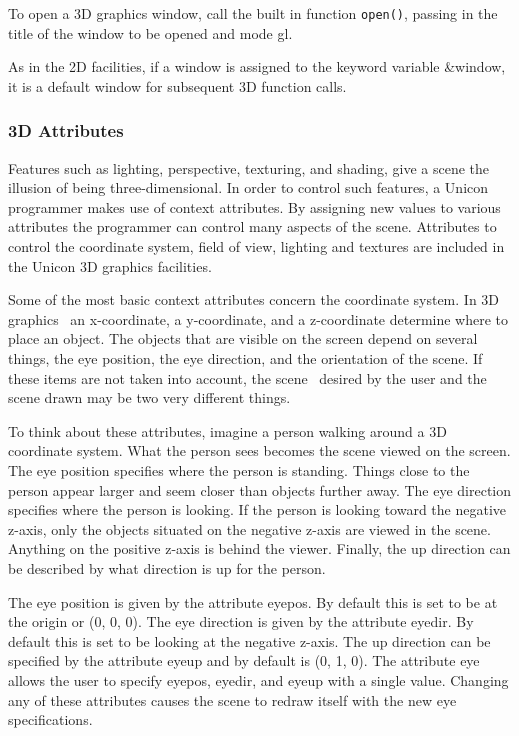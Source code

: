 To open a 3D graphics window, call the built in function \texttt{open()},
passing in the title of the window to be opened and mode
{\textquotedbl}gl{\textquotedbl}.


As in the 2D facilities, if a window is assigned to the keyword variable
\&window, it is a default window for subsequent 3D function calls. 

\subsubsection{3D Attributes}

Features such as lighting, perspective, texturing, and shading, give a
scene the illusion of being three-dimensional. In order to control such
features, a Unicon programmer makes use of context attributes. By
assigning new values to various attributes the programmer can control
many aspects of the scene. Attributes to control the coordinate system,
field of view, lighting and textures are included in the Unicon 3D
graphics facilities. 

Some of the most basic context attributes concern the coordinate system.
In 3D graphics \ an x-coordinate, a y-coordinate, and a z-coordinate
determine where to place an object. The objects that are visible on the
screen depend on several things, the eye position, the eye direction,
and the orientation of the scene. If these items are not taken into
account, the scene \ desired by the user and the scene drawn may be two
very different things. 

To think about these attributes, imagine a person walking around a 3D
coordinate system. What the person sees becomes the scene viewed on the
screen. The eye position specifies where the person is standing. Things
close to the person appear larger and seem closer than objects further
away. The eye direction specifies where the person is looking. If the
person is looking toward the negative z-axis, only the objects situated
on the negative z-axis are viewed in the scene. Anything on the
positive z-axis is behind the viewer. Finally, the up direction can be
described by what direction is up for the person. 

The eye position is given by the attribute eyepos. By default this is
set to be at the origin or (0, 0, 0). The eye direction is given by the
attribute eyedir. By default this is set to be looking at the negative
z-axis. The up direction can be specified by the attribute eyeup and by
default is (0, 1, 0). The attribute eye allows the user to specify
eyepos, eyedir, and eyeup with a single value. Changing any of these
attributes causes the scene to redraw itself with the new eye
specifications.


